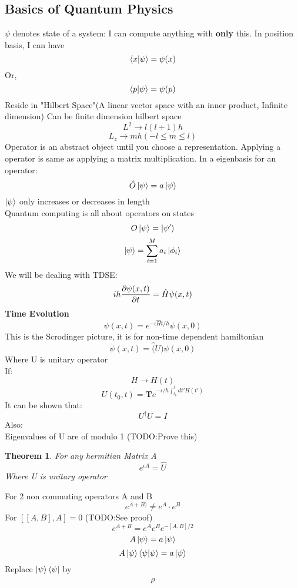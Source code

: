 \documentclass{scrartcl}
\newtheorem{theorem}{Theorem}
\begin{document}
\subsection{Basics of Quantum Physics}
\( \psi \) denotes state of a system: I can compute anything with \textbf{only} this.
In position basis, I can have
\[ \bra{x}\ket{\psi} = \psi(x) \]
Or,
\[ \bra{p}\ket{\psi} = \psi(p) \]
Reside in "Hilbert Space"(A linear vector space with an inner product, Infinite dimension)
Can be finite dimension hilbert space
\[ L^2 \rightarrow l(l+1)h \]\[ L_z \rightarrow mh (-l\leq m \leq l) \]
Operator is an abstract object until you choose a representation.
Applying a operator is same as applying a matrix multiplication.
In a eigenbasis for an operator:
\[ \hat{O} \ket{\psi} = a \ket{\psi} \]
\( \ket{\psi} \) only increases or decreases in length\\
Quantum computing is all about operators on states
\[ O \ket{\psi} = \ket{\psi'} \]
\begin{equation}
	\ket{\psi} = \displaystyle\sum_{i=1}^{M}a_i \ket{\phi_i}
	\label{eq:cmp}
\end{equation}
We will be dealing with TDSE:
\begin{equation}
	ih \pdv{\psi(x,t)}{t} = \hat{H}\psi(x,t)
	\label{eq:tdse}
\end{equation}
\textbf{Time Evolution}
\begin{equation}
	\psi(x,t) = e^{-\iota\hat{H}t/h} \psi(x,0)
	\label{eq:timeevol}
\end{equation}
This is the Scrodinger picture, it is for non-time dependent hamiltonian
\[ \psi(x,t) = \hat(U) \psi(x,0) \]
Where U is unitary operator\\
If:
\[ H \rightarrow H(t) \]
\[ U(t_0,t) = \mathbf{T} e^{-\iota/h \displaystyle\int_{t_0}^{t}dt' H(t')} \]
It can be shown that:
\[ U^\dagger U = I \]
Also:\\
Eigenvalues of U are of modulo 1 (TODO:Prove this)
\begin{theorem}
	For any hermitian Matrix A
	\begin{displaymath}
		e^{\iota A} = \hat{U}
	\end{displaymath}
	Where U is unitary operator	
\end{theorem}
For 2 non commuting operators A and B
\[ e^{A + B)} \neq e^A \cdot e^B \]
For \( [ [A,B], A] =0 \) (TODO:See proof)
\[ e^{A + B} = e^A e^B e^{-[A,B]/2} \]
\[ A \ket{\psi} = a \ket{\psi} \]\[ A \ket{\psi} \bra{\psi} \ket{\psi} = a \ket{\psi} \]
Replace \(  \ket{\psi} \bra{\psi}\) by \[ \hat{\rho} \]
\end{document}
